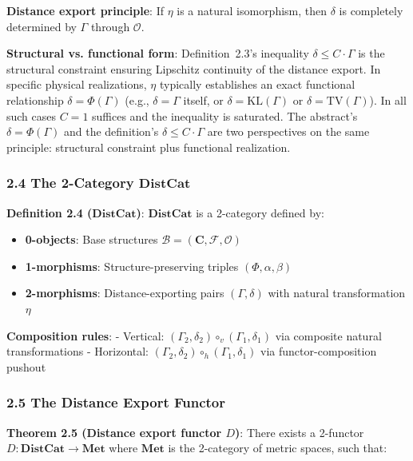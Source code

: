 \documentclass[
]{article}
\providecommand{\tightlist}{%
  \setlength{\itemsep}{0pt}\setlength{\parskip}{0pt}}
\begin{document}
\textbf{Distance export principle}: If \(\eta\) is a natural
isomorphism, then \(\delta\) is completely determined by \(\Gamma\)
through \(\mathcal{O}\).

\textbf{Structural vs. functional form}: Definition~2.3's inequality
\(\delta \leq C \cdot \Gamma\) is the structural constraint ensuring
Lipschitz continuity of the distance export. In specific physical
realizations, \(\eta\) typically establishes an exact functional
relationship \(\delta = \Phi(\Gamma)\) (e.g., \(\delta = \Gamma\)
itself, or \(\delta = \mathrm{KL}(\Gamma)\) or \(\delta = \mathrm{TV}(\Gamma)\)).
In all such cases \(C = 1\) suffices and the inequality is saturated.
The abstract's \(\delta = \Phi(\Gamma)\) and the definition's
\(\delta \leq C \cdot \Gamma\) are two perspectives on the same
principle: structural constraint plus functional realization.

\subsubsection{\texorpdfstring{2.4 The 2-Category
\(\mathbf{DistCat}\)}{2.4 The 2-Category \textbackslash mathbf\{DistCat\}}}\label{the-2-category-mathbfdistcat}

\textbf{Definition 2.4 (\(\mathbf{DistCat}\))}: \(\mathbf{DistCat}\) is
a 2-category defined by:

\begin{itemize}
\tightlist
\item
  \textbf{0-objects}: Base structures
  \(\mathcal{B} = (\mathbf{C}, \mathcal{F}, \mathcal{O})\)
\item
  \textbf{1-morphisms}: Structure-preserving triples
  \((\Phi, \alpha, \beta)\)
\item
  \textbf{2-morphisms}: Distance-exporting pairs \((\Gamma, \delta)\)
  with natural transformation \(\eta\)
\end{itemize}

\textbf{Composition rules}: - Vertical:
\((\Gamma_2, \delta_2) \circ_v (\Gamma_1, \delta_1)\) via composite
natural transformations - Horizontal:
\((\Gamma_2, \delta_2) \circ_h (\Gamma_1, \delta_1)\) via
functor-composition pushout

\subsubsection{2.5 The Distance Export
Functor}\label{the-distance-export-functor}

\textbf{Theorem 2.5 (Distance export functor \(D\))}: There exists a
2-functor \(D: \mathbf{DistCat} \to \mathbf{Met}\) where
\(\mathbf{Met}\) is the 2-category of metric spaces, such that:
\end{document}

